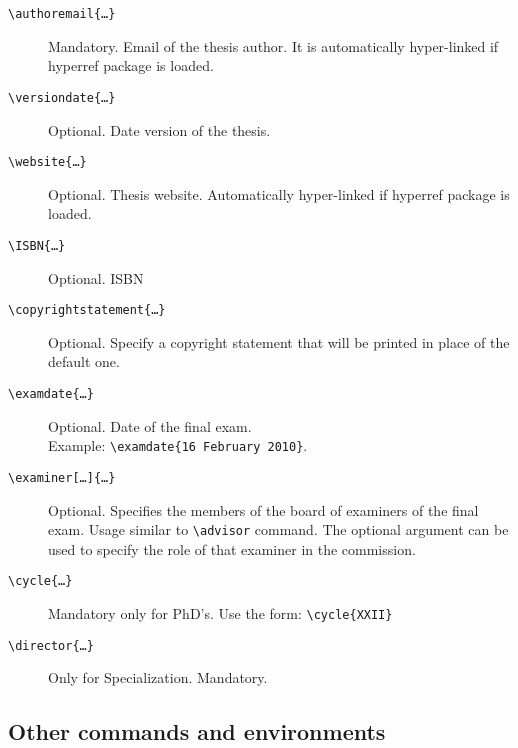 \documentclass[a5paper,11pt]{article}
\newcommand{\bs}{\textbackslash}
\begin{document}
\begin{description}
\item[\texttt{\bs authoremail\{\dots\}}] Mandatory. Email of the thesis author.
It is automatically hyper-linked if \textsf{hyperref} package is loaded.

\item[\texttt{\bs versiondate\{\dots\}}] Optional. Date version of the thesis.

\item[\texttt{\bs website\{\dots\}}] Optional. Thesis website. Automatically 
hyper-linked if \textsf{hyperref} package is loaded.

\item[\texttt{\bs ISBN\{\dots\}}] Optional. ISBN

\item[\texttt{\bs copyrightstatement\{\dots\}}] Optional. Specify a copyright statement that will be printed in place of the default one.


\item[\texttt{\bs examdate\{\dots\}}] Optional. Date of the final exam.\\
Example: \texttt{\bs examdate\{16 February 2010\}}.

\item[\texttt{\bs examiner[\dots]\{\dots\}}] Optional. Specifies the members of the
board of examiners of the final exam. Usage similar to \texttt{\bs advisor} command. The optional argument can be used to specify the role of that examiner in the commission.

\item[\texttt{\bs cycle\{\dots\}}] Mandatory only for PhD's. Use the form: \texttt{\bs cycle\{XXII\}}

\item[\texttt{\bs director\{\dots\}}] Only for Specialization. Mandatory.


\end{description}



\subsection[Other commands\\ and environments]{Other commands and environments}
\end{document}
